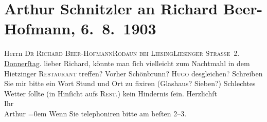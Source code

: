 

         
         \renewcommand{\erwaehntePersonen}{Personen: Richard Beer-Hofmann, Hugo von Hofmannsthal}
         \renewcommand{\erwaehnteOrte}{Orte: Liesingerstraße, Ottakringer Bräu, Palmenhaus Schönbrunn, Rodaun, Schloß Schönbrunn, Wien, XIII., Hietzing}
         \renewcommand{\erwaehnteWerke}{}
               \section[Arthur Schnitzler an Richard Beer-Hofmann, 6. 8. 1903]{ Arthur Schnitzler an Richard Beer-Hofmann, 6. 8. 1903}\nopagebreak{}\rehead{ }\begin{ledgroupsized}[t]{13cm}\normalsize\beginnumbering \toendnotes[C]{\smallbreak\pagebreak[2]} 
\toendnotes[C]{\smallbreak}\pstart{}{\pb}Herrn \textsc{Dr Richard
                            Beer-Hofmann}\pend{}\pstart{}\textsc{Rodaun bei Liesing}\pend{}\pstart{}\textsc{Liesinger Straße 2}.\pend{}{\bigskip}\pstart
           \raggedleft{}{\pb}\uline{Donnerſtag}.
                    \pend
           \pstart{}lieber Richard,\pend\pstart
           könnte man ſich vielleicht \label{K_L01306_1v}\label{K_L01306_1h} zum Nachtmahl in dem Hietzinger \textsc{Restaurant} treffen? Vorher Schönbrunn? \textsc{Hugo} desgleichen\textcolor{gray}{?}\pend
           \pstart
           Schreiben Sie mir bitte ein Wort {\pb}Stund und Ort zu
                    fixiren (Glashaus? Sieben?)
                    Schlechtes Wetter ſollte (in Hinſicht aufs \textsc{Rest.}) kein
                    Hindernis ſein.\pend
           \pstart
           Herzlichſt{\\[\baselineskip]}Ihr{\\[\baselineskip]}\spacefill\mbox{Arthur}\pend
           \leftskip=0em{}\pstart
           \noindent{}{\pb}Wenn Sie telephoniren bitte am beſten
                        2–3.\pend
           
         
         \endnumbering{}\end{ledgroupsized}  \newcommand{\dateiname}{L01306}\newcommand{\titel}{Arthur Schnitzler an Richard Beer-Hofmann, 6. 8. 1903}\newcommand{\editorInnen}{Martin Anton Müller und Gerd-Hermann Susen}
      